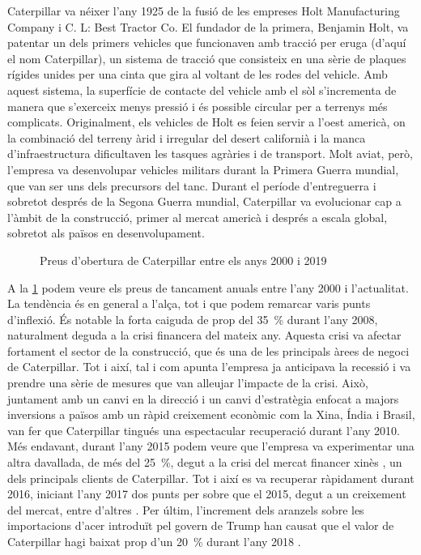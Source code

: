 \documentclass{article}
\numberwithin{table}{section}
\numberwithin{figure}{section}
\numberwithin{equation}{section}
\begin{document}
Caterpillar va néixer l'any 1925 de la fusió de les empreses Holt Manufacturing Company i C. L: Best Tractor Co. El fundador de la primera, Benjamin Holt, va patentar un dels primers vehicles que funcionaven amb tracció per eruga (d'aquí el nom Caterpillar), un sistema de tracció que consisteix en una sèrie de plaques rígides unides per una cinta que gira al voltant de les rodes del vehicle. Amb aquest sistema, la superfície de contacte del vehicle amb el sòl s'incrementa de manera que s'exerceix menys pressió i és possible circular per a terrenys més complicats. Originalment, els vehicles de Holt es feien servir a l'oest americà, on la combinació del terreny àrid i irregular del desert californià i la manca d'infraestructura dificultaven les tasques agràries i de transport. Molt aviat, però, l'empresa va desenvolupar vehicles militars durant la Primera Guerra mundial, que van ser uns dels precursors del tanc. Durant el període d'entreguerra i sobretot després de la Segona Guerra mundial, Caterpillar va evolucionar cap a l'àmbit de la construcció, primer al mercat americà i després a escala global, sobretot als països en desenvolupament. 

\begin{figure}[htb]
	\centering \sffamily \small
	
	\caption{Preus d'obertura de Caterpillar entre els anys 2000 i 2019}
	\label{fig:tancament}
\end{figure}

A la \cref{fig:tancament} podem veure els preus de tancament anuals entre l'any 2000 i l'actualitat. La tendència és en general a l'alça, tot i que podem remarcar varis punts d'inflexió. És notable la forta caiguda de prop del \SI{35}{\percent} durant l'any 2008, naturalment deguda a la crisi financera del mateix any. Aquesta crisi va afectar fortament el sector de la construcció, que és una de les principals àrees de negoci de Caterpillar. Tot i així, tal i com apunta \cite{recupera} l'empresa ja anticipava la recessió i va prendre una sèrie de mesures que van alleujar l'impacte de la crisi. Això, juntament amb un canvi en la direcció i un canvi d'estratègia enfocat a majors inversions a països amb un ràpid creixement econòmic com la Xina, Índia i Brasil, van fer que Caterpillar tingués una espectacular recuperació durant l'any 2010.
Més endavant, durant l'any 2015 podem veure que l'empresa va experimentar una altra davallada, de més del \SI{25}{\percent}, degut a la crisi del mercat financer xinès \cite{xina}, un dels principals clients de Caterpillar. Tot i així es va recuperar ràpidament durant 2016, iniciant l'any 2017 dos punts per sobre que el 2015, degut a un creixement del mercat, entre d'altres \cite{crush}. Per últim, l'increment dels aranzels sobre les importacions d'acer introduït pel govern de Trump han causat que el valor de Caterpillar hagi baixat prop d'un \SI{20}{\percent} durant l'any 2018 \cite{trump}. 
\end{document}
